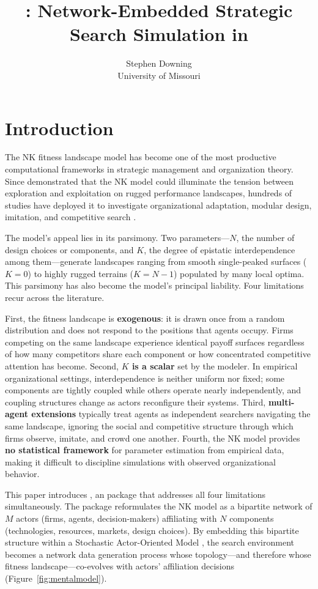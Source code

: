 \documentclass[
  article]{jss}
\author{
Stephen Downing\\University of Missouri
}
\title{\pkg{searchnet}: Network-Embedded Strategic Search Simulation in
\proglang{R}}
\begin{document}
\section{Introduction}\label{introduction}

The NK fitness landscape model
\citep{Kauffman1987, KauffmanWeinberger1989} has become one of the most
productive computational frameworks in strategic management and
organization theory. Since \citet{Levinthal1997} demonstrated that the
NK model could illuminate the tension between exploration and
exploitation on rugged performance landscapes, hundreds of studies have
deployed it to investigate organizational adaptation, modular design,
imitation, and competitive search
\citep{Baumann2019, Rivkin2000, SiggelkowRivkin2005}.

The model's appeal lies in its parsimony. Two parameters---\(N\), the
number of design choices or components, and \(K\), the degree of
epistatic interdependence among them---generate landscapes ranging from
smooth single-peaked surfaces (\(K = 0\)) to highly rugged terrains
(\(K = N - 1\)) populated by many local optima. This parsimony has also
become the model's principal liability. Four limitations recur across
the literature.

First, the fitness landscape is \textbf{exogenous}: it is drawn once
from a random distribution and does not respond to the positions that
agents occupy. Firms competing on the same landscape experience
identical payoff surfaces regardless of how many competitors share each
component or how concentrated competitive attention has become. Second,
\textbf{\(K\) is a scalar} set by the modeler. In empirical
organizational settings, interdependence is neither uniform nor fixed;
some components are tightly coupled while others operate nearly
independently, and coupling structures change as actors reconfigure
their systems. Third, \textbf{multi-agent extensions} typically treat
agents as independent searchers navigating the same landscape, ignoring
the social and competitive structure through which firms observe,
imitate, and crowd one another. Fourth, the NK model provides \textbf{no
statistical framework} for parameter estimation from empirical data,
making it difficult to discipline simulations with observed
organizational behavior.

This paper introduces , an  package that
addresses all four limitations simultaneously. The package reformulates
the NK model as a bipartite network of \(M\) actors (firms, agents,
decision-makers) affiliating with \(N\) components (technologies,
resources, markets, design choices). By embedding this bipartite
structure within a Stochastic Actor-Oriented Model
\citep[SAOM;][]{Snijders1996, SnijdersVdBuntSteglich2010}, the search
environment becomes a network data generation process whose
topology---and therefore whose fitness landscape---co-evolves with
actors' affiliation decisions (Figure~\ref{fig:mentalmodel}).
\end{document}

